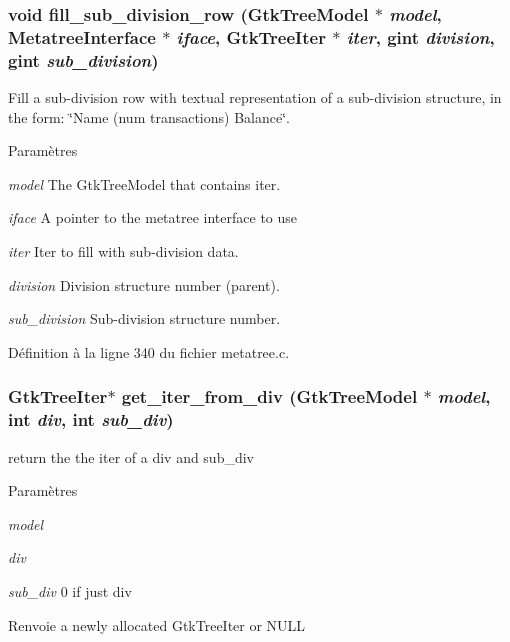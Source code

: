\subsubsection[{fill\_\-sub\_\-division\_\-row}]{\setlength{\rightskip}{0pt plus 5cm}void fill\_\-sub\_\-division\_\-row (GtkTreeModel $\ast$ {\em model}, \/  {\bf MetatreeInterface} $\ast$ {\em iface}, \/  GtkTreeIter $\ast$ {\em iter}, \/  gint {\em division}, \/  gint {\em sub\_\-division})}\label{metatree_8h_a1fcb870c7265355b6468ce6cf4c16d6c}
Fill a sub-\/division row with textual representation of a sub-\/division structure, in the form: \char`\"{}Name (num transactions)
 Balance\char`\"{}.


\begin{DoxyParams}{Paramètres}
\item[{\em model}]The GtkTreeModel that contains iter. \item[{\em iface}]A pointer to the metatree interface to use \item[{\em iter}]Iter to fill with sub-\/division data. \item[{\em division}]Division structure number (parent). \item[{\em sub\_\-division}]Sub-\/division structure number. \end{DoxyParams}


Définition à la ligne 340 du fichier metatree.c.

\subsubsection[{get\_\-iter\_\-from\_\-div}]{\setlength{\rightskip}{0pt plus 5cm}GtkTreeIter$\ast$ get\_\-iter\_\-from\_\-div (GtkTreeModel $\ast$ {\em model}, \/  int {\em div}, \/  int {\em sub\_\-div})}\label{metatree_8h_a88d6f9df7068417b2e7be60fd1968a1a}
return the the iter of a div and sub\_\-div


\begin{DoxyParams}{Paramètres}
\item[{\em model}]\item[{\em div}]\item[{\em sub\_\-div}]0 if just div\end{DoxyParams}
\begin{DoxyReturn}{Renvoie}
a newly allocated GtkTreeIter or NULL 
\end{DoxyReturn}


